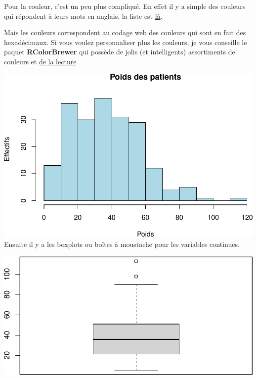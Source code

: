 \documentclass[
]{book}
\newenvironment{Shaded}{\begin{snugshade}}{\end{snugshade}}
\newcommand{\AttributeTok}[1]{\textcolor[rgb]{0.13,0.29,0.53}{#1}}
\newcommand{\FunctionTok}[1]{\textcolor[rgb]{0.13,0.29,0.53}{\textbf{#1}}}
\newcommand{\NormalTok}[1]{#1}
\newcommand{\SpecialCharTok}[1]{\textcolor[rgb]{0.81,0.36,0.00}{\textbf{#1}}}
\newcommand{\StringTok}[1]{\textcolor[rgb]{0.31,0.60,0.02}{#1}}
\begin{document}
Pour la couleur, c'est un peu plus compliqué. En effet il y a simple des couleurs
qui répondent à leurs mots en anglais, la liste est \href{https://www.datanovia.com/en/blog/awesome-list-of-657-r-color-names/}{là}.

Mais les couleurs correspondent au codage web des couleurs qui sont en fait des
hexadécimaux. Si vous voulez personnaliser plus les couleurs, je vous conseille
le paquet \textbf{RColorBrewer} qui possède de jolis (et intelligents) assortiments
de couleurs et \href{https://larmarange.github.io/analyse-R/couleurs.html}{de la lecture}

\begin{Shaded}
\end{Shaded}

\includegraphics{_main_files/figure-latex/unnamed-chunk-73-1.pdf}
Ensuite il y a les boxplots ou boîtes à moustache pour les variables continues.

\begin{Shaded}
\end{Shaded}

\includegraphics{_main_files/figure-latex/poids4-1.pdf}
\end{document}
